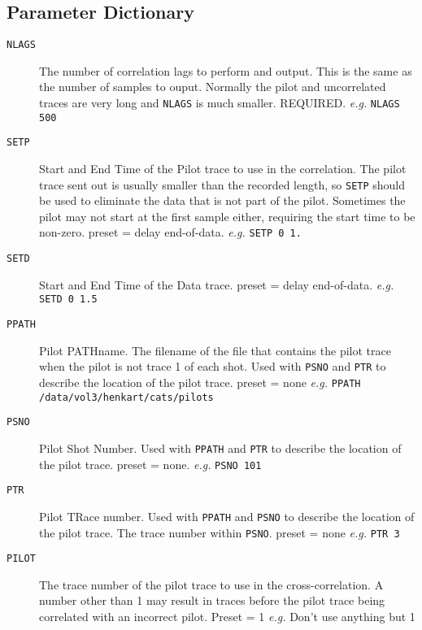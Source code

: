 \subsection{Parameter Dictionary}
\begin{description}

\item[\texttt{NLAGS}] The number of correlation lags to perform and output.  This
         is the same as the number of samples to ouput. Normally the
         pilot and uncorrelated traces are very long and \texttt{NLAGS} is
         much smaller.
         REQUIRED.      \textit{e.g.} \texttt{NLAGS 500}

\item[\texttt{SETP}] Start and End Time of the Pilot trace to use in the
         correlation.  The pilot trace sent out is usually smaller
         than the recorded length, so \texttt{SETP} should be used to eliminate
         the data that is not part of the pilot.  Sometimes the pilot
         may not start at the first sample either, requiring the start
         time to be non-zero.
         \Gls{preset} = delay end-of-data.     \textit{e.g.} \texttt{SETP 0 1.}

\item[\texttt{SETD}] Start and End Time of the Data trace.
         \Gls{preset} = delay end-of-data.    \textit{e.g.}  \texttt{SETD 0 1.5}

\item[\texttt{PPATH}] Pilot PATHname.  The filename of the file that contains the
         pilot trace when the pilot is not trace 1 of each \gls{shot}.
         Used with \texttt{PSNO} and \texttt{PTR} to describe the location of the pilot
         trace.
         \Gls{preset} = none    \textit{e.g.}  \texttt{PPATH /data/vol3/henkart/cats/pilots}

\item[\texttt{PSNO}] Pilot Shot Number.  Used with \texttt{PPATH} and \texttt{PTR} to describe the
         location of the pilot trace.
         \Gls{preset} = none.    \textit{e.g.} \texttt{PSNO 101}

\item[\texttt{PTR}] Pilot TRace number.  Used with \texttt{PPATH} and \texttt{PSNO} to describe the
         location of the pilot trace.  The trace number within \texttt{PSNO}.
         \Gls{preset} = none     \textit{e.g.}  \texttt{PTR 3}

\item[\texttt{PILOT}] The trace number of the pilot trace to use in the
         cross-correlation.  A number other than 1 may result in
         traces before the pilot trace being correlated with an
         incorrect pilot.
         Preset = 1     \textit{e.g.} Don't use anything but 1


\end{description}
